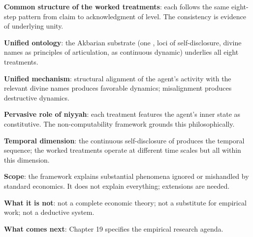 \begin{summarybox}
\textbf{Common structure of the worked treatments}: each follows
the same eight-step pattern from claim to acknowledgment of
level. The consistency is evidence of underlying unity.

\textbf{Unified ontology}: the Akbarian substrate (one
, loci of self-disclosure, divine names as principles
of articulation,  as continuous dynamic) underlies
all eight treatments.

\textbf{Unified mechanism}: structural alignment of the agent's
activity with the relevant divine names produces favorable
dynamics; misalignment produces destructive dynamics.

\textbf{Pervasive role of niyyah}: each treatment features the
agent's inner state as constitutive. The non-computability
framework grounds this philosophically.

\textbf{Temporal dimension}: the continuous self-disclosure of
 produces the temporal sequence; the worked treatments
operate at different time scales but all within this dimension.

\textbf{Scope}: the framework explains substantial phenomena
ignored or mishandled by standard economics. It does not explain
everything; extensions are needed.

\textbf{What it is not}: not a complete economic theory; not a
substitute for empirical work; not a deductive system.

\textbf{What comes next}: Chapter 19 specifies the empirical
research agenda.
\end{summarybox}

\cleardoublepage
